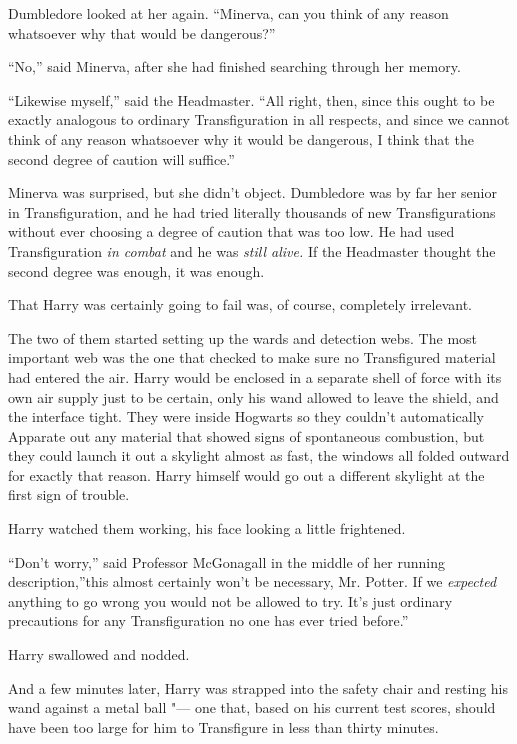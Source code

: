 Dumbledore looked at her again. ``Minerva, can you think of any reason
whatsoever why that would be dangerous?''

``No,'' said Minerva, after she had finished searching through her
memory.

``Likewise myself,'' said the Headmaster. ``All right, then, since this
ought to be exactly analogous to ordinary Transfiguration in all
respects, and since we cannot think of any reason whatsoever why it
would be dangerous, I think that the second degree of caution will
suffice.''

Minerva was surprised, but she didn't object. Dumbledore was by far her
senior in Transfiguration, and he had tried literally thousands of new
Transfigurations without ever choosing a degree of caution that was too
low. He had used Transfiguration \emph{in combat} and he was \emph{still
alive.} If the Headmaster thought the second degree was enough, it was
enough.

That Harry was certainly going to fail was, of course, completely
irrelevant.

The two of them started setting up the wards and detection webs. The
most important web was the one that checked to make sure no Transfigured
material had entered the air. Harry would be enclosed in a separate
shell of force with its own air supply just to be certain, only his wand
allowed to leave the shield, and the interface tight. They were inside
Hogwarts so they couldn't automatically Apparate out any material that
showed signs of spontaneous combustion, but they could launch it out a
skylight almost as fast, the windows all folded outward for exactly that
reason. Harry himself would go out a different skylight at the first
sign of trouble.

Harry watched them working, his face looking a little frightened.

``Don't worry,'' said Professor McGonagall in the middle of her running
description,''this almost certainly won't be necessary, Mr. Potter. If
we \emph{expected} anything to go wrong you would not be allowed to try.
It's just ordinary precautions for any Transfiguration no one has ever
tried before.''

Harry swallowed and nodded.

And a few minutes later, Harry was strapped into the safety chair and
resting his wand against a metal ball "--- one that, based on his current
test scores, should have been too large for him to Transfigure in less
than thirty minutes.

